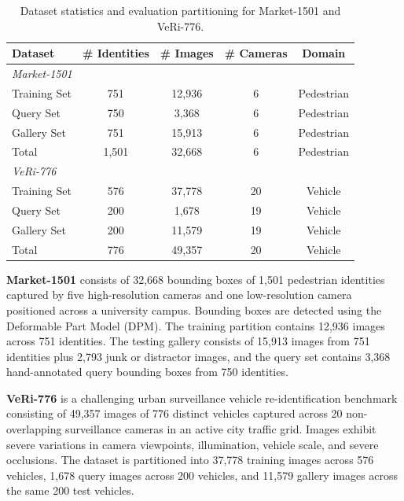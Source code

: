 \begin{table}[ht]
    \centering
    \caption[Dataset statistics and evaluation partitioning]{Dataset statistics and evaluation partitioning for Market-1501 and VeRi-776.}
    \label{tab:datasets}
    \begin{tabular}{l c c c c}
        \toprule
        \textbf{Dataset} & \textbf{\# Identities} & \textbf{\# Images} & \textbf{\# Cameras} & \textbf{Domain} \\
        \midrule
        \multicolumn{5}{l}{\textit{Market-1501 \cite{zheng2015scalable}}} \\
        \quad Training Set   & 751  & 12,936 & 6  & Pedestrian \\
        \quad Query Set      & 750  & 3,368  & 6  & Pedestrian \\
        \quad Gallery Set    & 751  & 15,913 & 6  & Pedestrian \\
        \quad Total          & 1,501& 32,668 & 6  & Pedestrian \\
        \midrule
        \multicolumn{5}{l}{\textit{VeRi-776 \cite{liu2016deepveri}}} \\
        \quad Training Set   & 576  & 37,778 & 20 & Vehicle \\
        \quad Query Set      & 200  & 1,678  & 19 & Vehicle \\
        \quad Gallery Set    & 200  & 11,579 & 19 & Vehicle \\
        \quad Total          & 776  & 49,357 & 20 & Vehicle \\
        \bottomrule
    \end{tabular}
\end{table}

\textbf{Market-1501} \cite{zheng2015scalable} consists of 32,668 bounding boxes of 1,501 pedestrian identities captured by five high-resolution cameras and one low-resolution camera positioned across a university campus. Bounding boxes are detected using the Deformable Part Model (DPM). The training partition contains 12,936 images across 751 identities. The testing gallery consists of 15,913 images from 751 identities plus 2,793 junk or distractor images, and the query set contains 3,368 hand-annotated query bounding boxes from 750 identities.

\textbf{VeRi-776} \cite{liu2016deepveri} is a challenging urban surveillance vehicle re-identification benchmark consisting of 49,357 images of 776 distinct vehicles captured across 20 non-overlapping surveillance cameras in an active city traffic grid. Images exhibit severe variations in camera viewpoints, illumination, vehicle scale, and severe occlusions. The dataset is partitioned into 37,778 training images across 576 vehicles, 1,678 query images across 200 vehicles, and 11,579 gallery images across the same 200 test vehicles.

